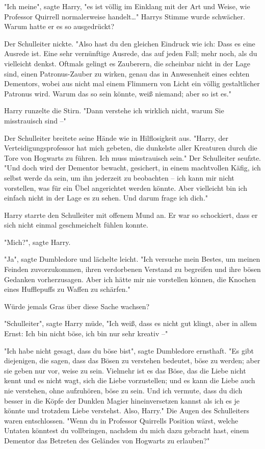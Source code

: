 {"Ich meine", sagte Harry, "es ist völlig im Einklang mit der Art und Weise, wie Professor Quirrell normalerweise handelt…" Harrys Stimme wurde schwächer. Warum hatte er es so ausgedrückt?

Der Schulleiter nickte. "Also hast du den gleichen Eindruck wie ich: Dass es eine Ausrede ist. Eine sehr vernünftige Ausrede, das auf jeden Fall; mehr noch, als du vielleicht denkst. Oftmals gelingt es Zauberern, die scheinbar nicht in der Lage sind, einen Patronus-Zauber zu wirken, genau das in Anwesenheit eines echten Dementors, wobei aus nicht mal einem Flimmern von Licht ein völlig gestaltlicher Patronus wird. Warum das so sein könnte, weiß niemand; aber so ist es."

Harry runzelte die Stirn. "Dann verstehe ich wirklich nicht, warum Sie misstrauisch sind --"

Der Schulleiter breitete seine Hände wie in Hilflosigkeit aus. "Harry, der Verteidigungsprofessor hat mich gebeten, die dunkelste aller Kreaturen durch die Tore von Hogwarts zu führen. Ich muss misstrauisch sein." Der Schulleiter seufzte. "Und doch wird der Dementor bewacht, gesichert, in einem machtvollen Käfig, ich selbst werde da sein, um ihn jederzeit zu beobachten -- ich kann mir nicht vorstellen, was für ein Übel angerichtet werden könnte. Aber vielleicht bin ich einfach nicht in der Lage es zu sehen. Und darum frage ich dich."

Harry starrte den Schulleiter mit offenem Mund an. Er war so schockiert, dass er sich nicht einmal geschmeichelt fühlen konnte.

"Mich?", sagte Harry.

"Ja", sagte Dumbledore und lächelte leicht. "Ich versuche mein Bestes, um meinen Feinden zuvorzukommen, ihren verdorbenen Verstand zu begreifen und ihre bösen Gedanken vorherzusagen. Aber ich hätte mir nie vorstellen können, die Knochen eines Hufflepuffs zu Waffen zu schärfen."

Würde jemals Gras über diese Sache wachsen?

"Schulleiter", sagte Harry müde, "Ich weiß, dass es nicht gut klingt, aber in allem Ernst: Ich bin nicht böse, ich bin nur sehr kreativ --"

"Ich habe nicht gesagt, dass du böse bist", sagte Dumbledore ernsthaft. "Es gibt diejenigen, die sagen, dass das Bösen zu verstehen bedeutet, böse zu werden; aber sie geben nur vor, weise zu sein. Vielmehr ist es das Böse, das die Liebe nicht kennt und es nicht wagt, sich die Liebe vorzustellen; und es kann die Liebe auch nie verstehen, ohne aufzuhören, böse zu sein. Und ich vermute, dass du dich besser in die Köpfe der Dunklen Magier hineinversetzen kannst als ich es je könnte und trotzdem Liebe verstehst. Also, Harry." Die Augen des Schulleiters waren entschlossen. "Wenn du in Professor Quirrells Position wärst, welche Untaten könntest du vollbringen, nachdem du mich dazu gebracht hast, einem Dementor das Betreten des Geländes von Hogwarts zu erlauben?"

}
